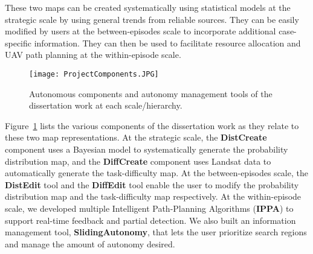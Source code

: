 These two maps can be created systematically using statistical models at the strategic scale by using general trends from  reliable sources. They can be easily modified by users at the between-episodes scale to incorporate additional case-specific information. They can then be used to facilitate resource allocation and UAV path planning at the within-episode scale. 


\begin{figure}
\centering
\texttt{[image: ProjectComponents.JPG]}
\caption{Autonomous components and autonomy management tools of the dissertation work at each scale/hierarchy.}
\label{ProjectComponents}
\end{figure}

Figure~\ref{ProjectComponents} lists the various components of the dissertation work as they relate to these two map representations. At the strategic scale, the \textbf{DistCreate} component uses a Bayesian model to systematically generate the probability distribution map, and the \textbf{DiffCreate} component uses Landsat data to automatically generate the task-difficulty map. At the between-episodes scale, the \textbf{DistEdit} tool and the \textbf{DiffEdit} tool enable the user to modify the probability distribution map and the task-difficulty map respectively. At the within-episode scale, we developed multiple Intelligent Path-Planning Algorithms (\textbf{IPPA}) to support real-time feedback and partial detection. We also built an information management tool, \textbf{SlidingAutonomy}, that lets the user prioritize search regions and manage the amount of autonomy desired.

